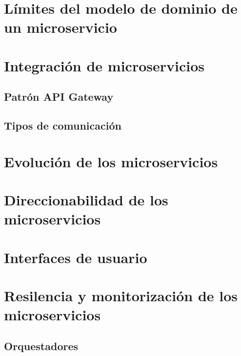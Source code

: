 \documentclass[11pt,a4paper]{article}
\begin{document}
\section{Límites del modelo de dominio de un microservicio}

\section{Integración de microservicios}

\subsection{Patrón API Gateway}

\subsection{Tipos de comunicación}

\section{Evolución de los microservicios}

\section{Direccionabilidad de los microservicios}

\section{Interfaces de usuario}

\section{Resilencia y monitorización de los microservicios}

\subsection{Orquestadores}
\end{document}
